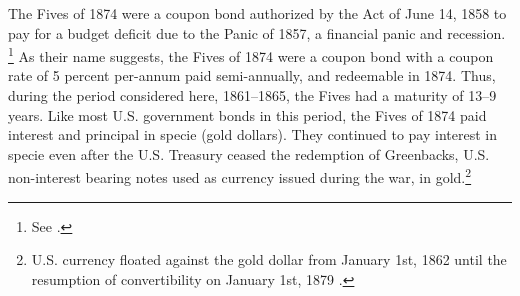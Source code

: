The Fives of 1874 were a coupon bond authorized by the Act of June 14, 1858 to pay for a budget deficit due to the Panic of 1857, a financial panic and recession.%
\footnote{
  See \textcites[p. 76]{Bayley1882}[78--79]{DeKnight1900}[42-43]{Treasury1863}[300-301, 305]{HomerSylla2005}.
}
As their name suggests, the Fives of 1874 were a coupon bond with a coupon rate of 5 percent per-annum paid semi-annually, and redeemable in 1874.
Thus, during the period considered here, 1861--1865, the Fives had a maturity of 13--9 years.
Like most U.S. government bonds in this period, the Fives of 1874 paid interest and principal in specie (gold dollars).
They continued to pay interest in specie even after the U.S. Treasury ceased the redemption of Greenbacks, U.S. non-interest bearing notes used as currency issued during the war, in gold.\footnote{
  U.S. currency floated against the gold dollar from January 1st, 1862 until the resumption of convertibility on January 1st, 1879 \parencites{Mitchell1908}{Dewey1918}{WillardGuinnaneEtAl1996}.
}

